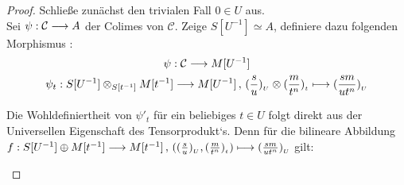 \documentclass[10pt,a4paper]{report}
\newcommand{\comment}[1]{}
\newcommand{\functionfront}[3]{\nolinebreak{#1:#2 \longrightarrow #3}}
\newcommand{\function}[5]{\nolinebreak{#1:#2 \longrightarrow #3 \, , \, #4 \longmapsto #5}}
\newcommand{\Tensor}[3]{#1 \otimes_{#2} #3}
\newcommand{\tensor}[3]{#1 \otimes #3}
\newcommand{\lok}[2]{#1 [#2^{-1}]}
\newcommand{\loke}[3]{(\frac{#1}{#2})_{_{#3}}}
\begin{document}
\begin{proof}
Schließe zunächst den trivialen Fall $0 \in U$ aus.\\
Sei $\functionfront{\psi}{\mathcal{C}}{A}$ der Colimes von $\mathcal{C}$. Zeige $\lok{S}{U} \simeq A$, definiere dazu folgenden Morphismus \comment{\label{das phi ein Mophismus ist überlasse ich dem Leser}}:
\begin{gather*}
\functionfront{\psi}{\mathcal{C}}{\lok{M}{U}} \\
\comment{
\function{\psi_{\Tensor{\lok{S}{U}}{\lok{S}{t}}{\lok{M}{t}}}}{\Tensor{\lok{S}{U}}{\lok{S}{t}}{\lok{M}{t}}}{\lok{M}{U}}{\tensor{\loke{s}{u}{U}}{\lok{S}{t}}{\loke{m}{t^n}{t}}}{\loke{sm}{ut^n}{U}} \\
}
\function{\psi_{t}}{\Tensor{\lok{S}{U}}{\lok{S}{t}}{\lok{M}{t}}}{\lok{M}{U}}{\tensor{\loke{s}{u}{U}}{\lok{S}{t}}{\loke{m}{t^n}{t}}}{\loke{sm}{ut^n}{U}}
\end{gather*}

Die Wohldefiniertheit von $\psi'_t$ für ein beliebiges $t \in U$ folgt direkt aus der Universellen Eigenschaft des Tensorprodukt`s. Denn für die bilineare Abbildung
 $\function{f}{\lok{S}{U} \oplus \lok{M}{t}}{\lok{M}{t}}{(\loke{s}{u}{U}, \loke{m}{t^n}{t})}{\loke{sm}{ut^n}{U}}$  gilt:
\begin{center}
\end{center} 
 

\end{proof}
\end{document}
